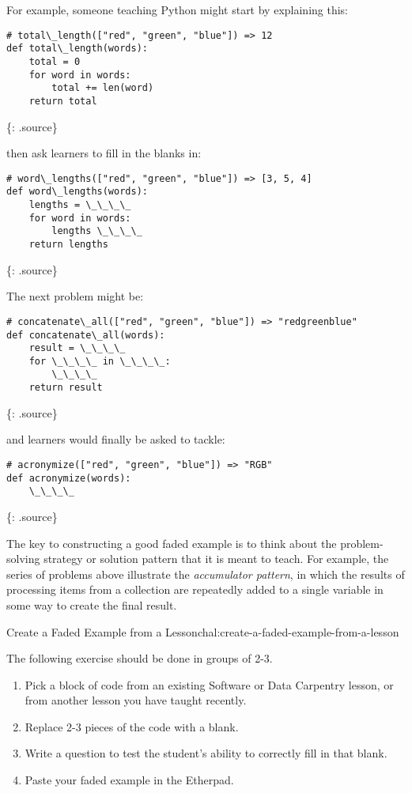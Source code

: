 For example, someone teaching Python might start by explaining this:

\begin{verbatim}
# total\_length(["red", "green", "blue"]) => 12
def total\_length(words):
    total = 0
    for word in words:
        total += len(word)
    return total
\end{verbatim}

\{: .source\}

then ask learners to fill in the blanks in:

\begin{verbatim}
# word\_lengths(["red", "green", "blue"]) => [3, 5, 4]
def word\_lengths(words):
    lengths = \_\_\_\_
    for word in words:
        lengths \_\_\_\_
    return lengths
\end{verbatim}

\{: .source\}

The next problem might be:

\begin{verbatim}
# concatenate\_all(["red", "green", "blue"]) => "redgreenblue"
def concatenate\_all(words):
    result = \_\_\_\_
    for \_\_\_\_ in \_\_\_\_:
        \_\_\_\_
    return result
\end{verbatim}

\{: .source\}

and learners would finally be asked to tackle:

\begin{verbatim}
# acronymize(["red", "green", "blue"]) => "RGB"
def acronymize(words):
    \_\_\_\_
\end{verbatim}

\{: .source\}

The key to constructing a good faded example is to think about the
problem-solving strategy or solution pattern that it is meant to teach.
For example, the series of problems above illustrate the
\emph{accumulator pattern}, in which the results of processing items
from a collection are repeatedly added to a single variable in some way
to create the final result.

\begin{challenge}{Create a Faded Example from a Lesson}{chal:create-a-faded-example-from-a-lesson}

The following exercise should be done in groups of 2-3.

\begin{enumerate}
\def\labelenumi{\arabic{enumi}.}
\itemsep1pt\parskip0pt
\item
  Pick a block of code from an existing Software or Data Carpentry
  lesson, or from another lesson you have taught recently.
\item
  Replace 2-3 pieces of the code with a blank.
\item
  Write a question to test the student's ability to correctly fill in
  that blank.
\item
  Paste your faded example in the Etherpad.
\end{enumerate}
\end{challenge}

